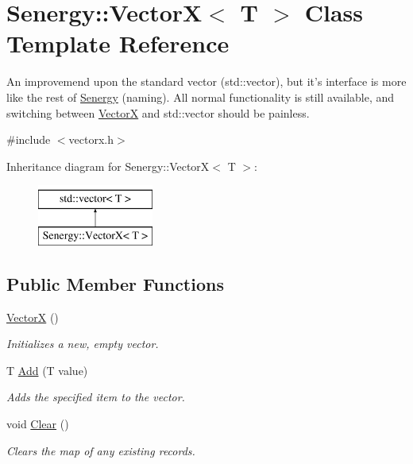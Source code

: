 \hypertarget{class_senergy_1_1_vector_x}{\section{Senergy\-:\-:Vector\-X$<$ T $>$ Class Template Reference}
\label{class_senergy_1_1_vector_x}
}


An improvemend upon the standard vector (std\-::vector), but it's interface is more like the rest of \hyperlink{namespace_senergy}{Senergy} (naming). All normal functionality is still available, and switching between \hyperlink{class_senergy_1_1_vector_x}{Vector\-X} and std\-::vector should be painless.  




{\ttfamily \#include $<$vectorx.\-h$>$}

Inheritance diagram for Senergy\-:\-:Vector\-X$<$ T $>$\-:\begin{figure}[H]
\begin{center}
\leavevmode
\includegraphics[height=2.000000cm]{class_senergy_1_1_vector_x}
\end{center}
\end{figure}
\subsection*{Public Member Functions}
\begin{DoxyCompactItemize}
\item 
\hyperlink{class_senergy_1_1_vector_x_a99bed6d49a3a93e6a133837330218ee7}{Vector\-X} ()
\begin{DoxyCompactList}\small\item\em Initializes a new, empty vector. \end{DoxyCompactList}\item 
T \hyperlink{class_senergy_1_1_vector_x_a4df34dceed944ef14df649a538d9c1b1}{Add} (T value)
\begin{DoxyCompactList}\small\item\em Adds the specified item to the vector. \end{DoxyCompactList}\item 
void \hyperlink{class_senergy_1_1_vector_x_a2b84162c380303ed38e73d8d529c62dd}{Clear} ()
\begin{DoxyCompactList}\small\item\em Clears the map of any existing records. \end{DoxyCompactList}\end{DoxyCompactItemize}


